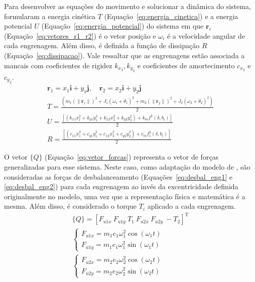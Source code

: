 Para desenvolver as equações do movimento e solucionar a dinâmica do sistema,  formularam a energia cinética $T$ (Equação~\ref{eq:energia_cinetica}) e a energia potencial $U$ (Equação~\ref{eq:energia_potencial}) do sistema em que $\boldsymbol{r}_i$ (Equação~\ref{eq:vetores_r1_r2}) é o vetor posição e $\omega_i$ é a velocidade angular de cada engrenagem.  Além disso, é definida a função de dissipação $R$ (Equação~\ref{eq:dissipacao}). Vale ressaltar que as engrenagens estão associada a mancais com  coeficientes de rigidez ${k_x}_i, {k_y}_i$ e coeficientes de amortecimento ${c_x}_i$ e ${c_y}_i$.
\begin{gather}
	\boldsymbol{r}_1 = x_1\boldsymbol{i} + y_1\boldsymbol{j}, \quad \boldsymbol{r}_2 = x_2\boldsymbol{i} + y_2\boldsymbol{j}
	\label{eq:vetores_r1_r2}
\\
	T = \frac{(m_1(\|\dot{\boldsymbol{r}}_1\|)^2 + J_1(\omega_1 + \dot{\theta}_1)^2 + m_2(\|\dot{\boldsymbol{r}}_2\|)^2 + J_2(\omega_2 + \dot{\theta}_2)^2)}{2}
	\label{eq:energia_cinetica}
\\
	U = \frac{[ (k_{x1}x_1^2 + k_{y1}y_1^2 + k_{x2}x_2^2 + k_{y2}y_2^2) + k_m f^2(\delta, b_t) ]}{2}
	\label{eq:energia_potencial}
\\
	R =\frac{ [ (c_{x1}\dot{x}_1^2 + c_{y1}\dot{y}_1^2 + c_{x2}\dot{x}_2^2 + c_{y2}\dot{y}_2^2) + c_m f_1^2(\delta, b_t) ]}{2}
	\label{eq:dissipacao}
\end{gather}

O vetor $\{Q\}$ (Equação~\ref{eq:vetor_forcas}) representa o vetor de forças generalizadas para esse sistema. Neste caso, como adaptação do modelo de , são consideradas as forças de desbalanceamento (Equações~\ref{eq:desbal_eng1} e \ref{eq:desbal_eng2}) para cada engrenagem ao invés da  excentricidade definida originalmente no modelo, uma vez que a representação física e matemática é a mesma. Além disso, é considerado o torque $T_i$ aplicado a cada engrenagem.
\begin{gather}
	\{Q\} = [F_{u1x} \ F_{u1y} \ T_1 \ F_{u2x} \ F_{u2y} \ -T_2]^{\mathrm{T}}
	\label{eq:vetor_forcas}
\\
	\begin{cases} 
		F_{u1x} = m_1 e_1 \omega_1^2 \cos(\omega_1 t) \\
		F_{u1y} = m_1 e_1 \omega_1^2 \sin(\omega_1 t)
	\end{cases}
	\label{eq:desbal_eng1}
\\
	\begin{cases} 
		F_{u2x} = m_2 e_2 \omega_2^2 \cos(\omega_2 t) \\
		F_{u2y} = m_2 e_2 \omega_2^2 \sin(\omega_2 t)
	\end{cases}
	\label{eq:desbal_eng2}
\end{gather}

